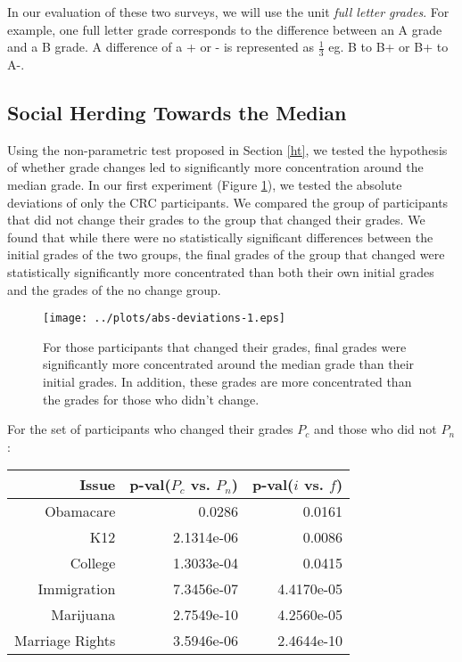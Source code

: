 In our evaluation of these two surveys, we will use the unit \emph{full letter grades}.
For example, one full letter grade corresponds to the difference between an A grade and a B grade. 
A difference of a + or - is represented as $\frac{1}{3}$ eg. B to B+ or B+ to A-. 

\subsection{Social Herding Towards the Median}
Using the non-parametric test proposed in Section \ref{ht}, we tested the hypothesis of whether grade changes led to significantly more concentration around the median grade.
In our first experiment (Figure \ref{mdev-1}), we tested the absolute deviations of only the CRC participants.
We compared the group of participants that did not change their grades to the group that changed their grades.
We found that while there were no statistically significant differences between the initial grades of the two groups, the final grades of the group that changed were statistically significantly more concentrated than both their own initial grades and the grades of the no change group.
\begin{figure}[h]
  \centering
    \texttt{[image: ../plots/abs-deviations-1.eps]}
      \caption{For those participants that changed their grades, final grades were significantly more concentrated around the median grade than their initial grades. In addition, these grades are more concentrated than the grades for those who didn't change.}
      \label{mdev-1}
\end{figure}

For the set of participants who changed their grades $P_c$ and those who did not $P_n$:

\begin{tabular}[!ht] { r | r | r }
\label{dev-2}
  Issue & p-val($P_c$ vs. $P_n$) & p-val($i$ vs. $f$) \\
  \hline
  \hline
  Obamacare &  0.0286 & 0.0161 \\
  \hline
  K12 & 2.1314e-06 &  0.0086 \\
  \hline
  College & 1.3033e-04 & 0.0415 \\
  \hline
  Immigration & 7.3456e-07 &4.4170e-05\\
  \hline
  Marijuana & 2.7549e-10 & 4.2560e-05\\
  \hline
  Marriage Rights & 3.5946e-06 & 2.4644e-10 \\
\end{tabular}

